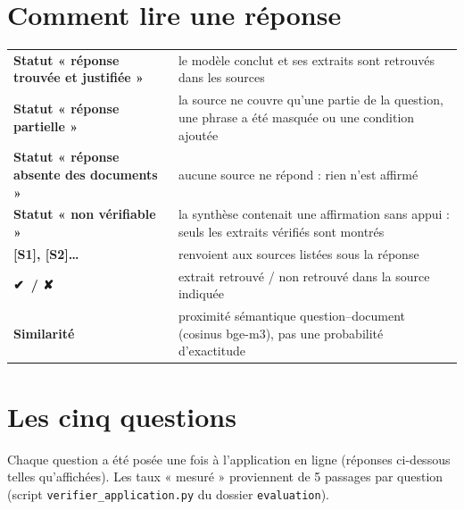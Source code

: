 \documentclass[11pt,a4paper]{article}
\newcommand{\ok}{\textcolor{vert}{{\symb ✔}}}
\newcommand{\ko}{\textcolor{rouge}{{\symb ✘}}}
\begin{document}
\section*{Comment lire une réponse}
\begin{tabularx}{\linewidth}{>{\bfseries}l X}
\toprule
Statut « réponse trouvée et justifiée » & le modèle conclut et ses extraits sont retrouvés dans les sources \\
Statut « réponse partielle » & la source ne couvre qu'une partie de la question, une phrase a été masquée ou une condition ajoutée \\
Statut « réponse absente des documents » & aucune source ne répond : rien n'est affirmé \\
Statut « non vérifiable » & la synthèse contenait une affirmation sans appui : seuls les extraits vérifiés sont montrés \\
{[S1], [S2]…} & renvoient aux sources listées sous la réponse \\
\ok\ / \ko & extrait retrouvé / non retrouvé dans la source indiquée \\
Similarité & proximité sémantique question–document (cosinus bge-m3), pas une probabilité d'exactitude \\
\bottomrule
\end{tabularx}

\section{Les cinq questions}
Chaque question a été posée une fois à l'application en ligne (réponses ci-dessous telles
qu'affichées). Les taux « mesuré » proviennent de 5 passages par question
(script \texttt{verifier\_application.py} du dossier \texttt{evaluation}).
\end{document}
